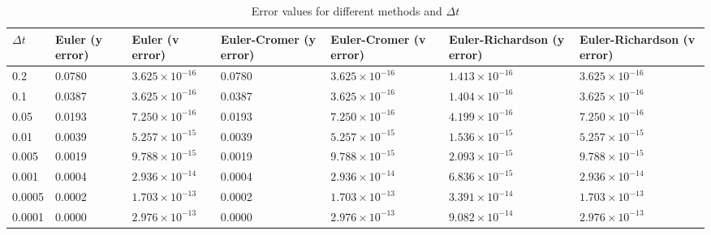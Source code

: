 \documentclass[11pt]{article}
\begin{document}
\begin{question}

	\begin{table}[h!]
		\centering
		\begin{tabularx}{\textwidth}{|X|X|X|X|X|X|X|}
		\hline
		$\Delta t$ & Euler (y error) & Euler (v error) & Euler-Cromer (y error) & Euler-Cromer (v error) & Euler-Richardson (y error) & Euler-Richardson (v error) \\
		\hline
		0.2    & 0.0780 & $3.625 \times 10^{-16}$ & 0.0780 & $3.625 \times 10^{-16}$ & $1.413 \times 10^{-16}$ & $3.625 \times 10^{-16}$ \\
		0.1    & 0.0387 & $3.625 \times 10^{-16}$ & 0.0387 & $3.625 \times 10^{-16}$ & $1.404 \times 10^{-16}$ & $3.625 \times 10^{-16}$ \\
		0.05   & 0.0193 & $7.250 \times 10^{-16}$ & 0.0193 & $7.250 \times 10^{-16}$ & $4.199 \times 10^{-16}$ & $7.250 \times 10^{-16}$ \\
		0.01   & 0.0039 & $5.257 \times 10^{-15}$ & 0.0039 & $5.257 \times 10^{-15}$ & $1.536 \times 10^{-15}$ & $5.257 \times 10^{-15}$ \\
		0.005  & 0.0019 & $9.788 \times 10^{-15}$ & 0.0019 & $9.788 \times 10^{-15}$ & $2.093 \times 10^{-15}$ & $9.788 \times 10^{-15}$ \\
		0.001  & 0.0004 & $2.936 \times 10^{-14}$ & 0.0004 & $2.936 \times 10^{-14}$ & $6.836 \times 10^{-15}$ & $2.936 \times 10^{-14}$ \\
		0.0005 & 0.0002 & $1.703 \times 10^{-13}$ & 0.0002 & $1.703 \times 10^{-13}$ & $3.391 \times 10^{-14}$ & $1.703 \times 10^{-13}$ \\
		0.0001 & 0.0000 & $2.976 \times 10^{-13}$ & 0.0000 & $2.976 \times 10^{-13}$ & $9.082 \times 10^{-14}$ & $2.976 \times 10^{-13}$ \\
		\hline
		\end{tabularx}
		\caption{Error values for different methods and $\Delta t$}
		\label{tab:error_values}
		\end{table}
\end{question}
\end{document}
